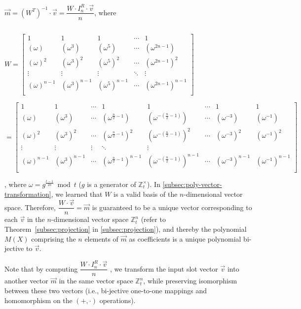 $\vec{m} = (W^T)^{-1} \cdot \vec{v} = \dfrac{W \cdot I_n^R \cdot \vec{v}}{n}$, \text{ } where

$ $

$W =  \begin{bmatrix}
1 & 1 & 1 & \cdots & 1\\
(\omega) & (\omega^3) & (\omega^5) & \cdots & (\omega^{2n-1})\\
(\omega)^2 & (\omega^3)^2 & (\omega^5)^2 & \cdots & (\omega^{2n-1})^2\\
\vdots & \vdots & \vdots & \ddots & \vdots \\
(\omega)^{n-1} & (\omega^3)^{n-1} & (\omega^5)^{n-1} & \cdots & (\omega^{2n-1})^{n-1}\\
\end{bmatrix}$

$= \begin{bmatrix}
1 & 1 & \cdots & 1 & 1 & \cdots & 1 & 1\\
(\omega) & (\omega^3) & \cdots & (\omega^{\frac{n}{2} - 1}) & (\omega^{-(\frac{n}{2} - 1)}) & \cdots & (\omega^{-3}) & (\omega^{-1})\\
(\omega)^2 & (\omega^3)^2 & \cdots & (\omega^{\frac{n}{2} - 1})^2 & (\omega^{-(\frac{n}{2} - 1)})^2 & \cdots & (\omega^{-3})^2 & (\omega^{-1})^2\\
\vdots & \vdots & \vdots & \ddots & \vdots \\
(\omega)^{n-1} & (\omega^3)^{n-1} & \cdots & (\omega^{\frac{n}{2} - 1})^{n-1} & (\omega^{-(\frac{n}{2} - 1)})^{n-1} & \cdots & (\omega^{-3})^{n-1} & (\omega^{-1})^{n-1}\\
\end{bmatrix}$

, where $\omega = g^{\frac{t - 1}{2n}} \bmod t$ ($g$ is a generator of $\mathbb{Z}_t^{\times}$). In \autoref{subsec:poly-vector-transformation}, we learned that $W$ is a valid basis of the $n$-dimensional vector space. Therefore, $\dfrac{W \cdot \vec{v}}{n} = \vec{m}$ is guaranteed to be a unique vector corresponding to each $\vec{v}$ in the $n$-dimensional vector space $\mathbb{Z}_t^{n}$ (refer to Theorem~\ref*{subsec:projection} in \autoref{subsec:projection}), and thereby the polynomial $M(X)$ comprising the $n$ elements of $\vec{m}$ as coefficients is a unique polynomial bi-jective to $\vec{v}$. 

Note that by computing $\dfrac{W \cdot I_n^R \cdot \vec{v}}{n}$
, we transform the input slot vector $\vec{v}$ into another vector $\vec{m}$ in the same vector space $\mathbb{Z}_t^{n}$, while preserving isomorphism between these two vectors (i.e., bi-jective one-to-one mappings and homomorphism on the $(+, \cdot)$ operations). 

